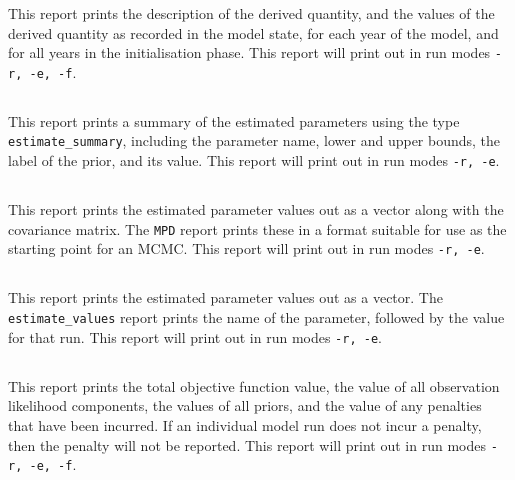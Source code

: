This report prints the description of the derived quantity, and the values of the derived quantity as recorded in the model state, for each year of the model, and for all years in the initialisation phase. This report will print out in run modes \texttt{-r, -e, -f}.

\subsection{}\label{sec:Report-EstimateSummary}

This report prints a summary of the estimated parameters using the type \texttt{estimate\_summary}, including the parameter name, lower and upper bounds, the label of the prior, and its value. This report will print out in run modes \texttt{-r, -e}.

\subsection{}\label{sec:Report-MPD}

This report prints the estimated parameter values out as a vector along with the covariance matrix. The \texttt{MPD} report prints these in a format suitable for use as the starting point for an MCMC. This report will print out in run modes \texttt{-r, -e}.

\subsection{}\label{sec:Report-EstimateValue}

This report prints the estimated parameter values out as a vector. The \texttt{estimate\_values} report prints the name of the parameter, followed by the value for that run. This report will print out in run modes \texttt{-r, -e}.

\subsection{}\label{sec:Report-ObjectiveFunction}

This report prints the total objective function value, the value of all observation likelihood components, the values of all priors, and the value of any penalties that have been incurred. If an individual model run does not incur a penalty, then the penalty will not be reported. This report will print out in run modes \texttt{-r, -e, -f}.

